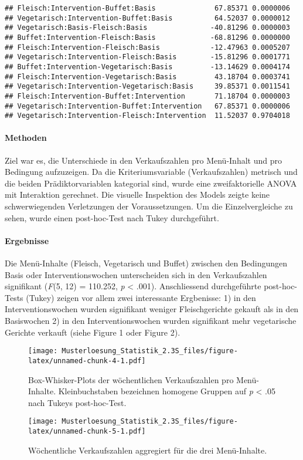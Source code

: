 \documentclass[]{article}
\let\oldparagraph\paragraph
\renewcommand{\paragraph}[1]{\oldparagraph{#1}\mbox{}}
\begin{document}
\begin{verbatim}
## Fleisch:Intervention-Buffet:Basis              67.85371 0.0000006
## Vegetarisch:Intervention-Buffet:Basis          64.52037 0.0000012
## Vegetarisch:Basis-Fleisch:Basis               -40.81296 0.0000003
## Buffet:Intervention-Fleisch:Basis             -68.81296 0.0000000
## Fleisch:Intervention-Fleisch:Basis            -12.47963 0.0005207
## Vegetarisch:Intervention-Fleisch:Basis        -15.81296 0.0001771
## Buffet:Intervention-Vegetarisch:Basis         -13.14629 0.0004174
## Fleisch:Intervention-Vegetarisch:Basis         43.18704 0.0003741
## Vegetarisch:Intervention-Vegetarisch:Basis     39.85371 0.0011541
## Fleisch:Intervention-Buffet:Intervention       71.18704 0.0000003
## Vegetarisch:Intervention-Buffet:Intervention   67.85371 0.0000006
## Vegetarisch:Intervention-Fleisch:Intervention  11.52037 0.9704018
\end{verbatim}

\paragraph{Methoden}\label{methoden}

Ziel war es, die Unterschiede in den Verkaufszahlen pro Menü-Inhalt und
pro Bedingung aufzuzeigen. Da die Kriteriumsvariable (Verkaufszahlen)
metrisch und die beiden Prädiktorvariablen kategorial sind, wurde eine
zweifaktorielle ANOVA mit Interaktion gerechnet. Die visuelle Inspektion
des Models zeigte keine schwerwiegenden Verletzungen der
Voraussetzungen. Um die Einzelvergleiche zu sehen, wurde einen
post-hoc-Test nach Tukey durchgeführt.

\paragraph{Ergebnisse}\label{ergebnisse}

Die Menü-Inhalte (Fleisch, Vegetarisch und Buffet) zwischen den
Bedingungen Basis oder Interventionswochen unterscheiden sich in den
Verkaufszahlen signifikant (\emph{F}(5, 12) = 110.252, \emph{p}
\textless{} .001). Anschliessend durchgeführte post-hoc-Tests (Tukey)
zeigen vor allem zwei interessante Ergbenisse: 1) in den
Interventionswochen wurden signifikant weniger Fleischgerichte gekauft
als in den Basiswochen 2) in den Interventionswochen wurden signifikant
mehr vegetarische Gerichte verkauft (siehe Figure 1 oder Figure 2).

\begin{figure}
\centering
\texttt{[image: Musterloesung\_Statistik\_2.3S\_files/figure-latex/unnamed-chunk-4-1.pdf]}
\caption{Box-Whisker-Plots der wöchentlichen Verkaufszahlen pro
Menü-Inhalte. Kleinbuchstaben bezeichnen homogene Gruppen auf \emph{p}
\textless{} .05 nach Tukeys post-hoc-Test.}
\end{figure}

\begin{figure}
\centering
\texttt{[image: Musterloesung\_Statistik\_2.3S\_files/figure-latex/unnamed-chunk-5-1.pdf]}
\caption{Wöchentliche Verkaufszahlen aggregiert für die drei
Menü-Inhalte.}
\end{figure}
\end{document}
